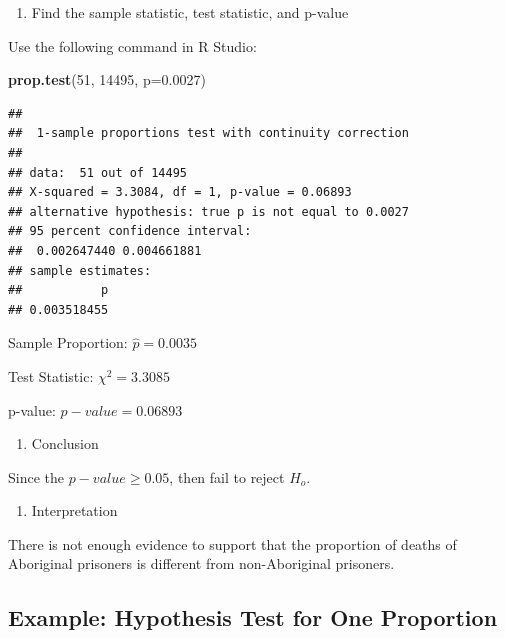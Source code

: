 \documentclass[
]{book}
\newenvironment{Shaded}{\begin{snugshade}}{\end{snugshade}}
\newcommand{\DataTypeTok}[1]{\textcolor[rgb]{0.13,0.29,0.53}{#1}}
\newcommand{\DecValTok}[1]{\textcolor[rgb]{0.00,0.00,0.81}{#1}}
\newcommand{\FloatTok}[1]{\textcolor[rgb]{0.00,0.00,0.81}{#1}}
\newcommand{\KeywordTok}[1]{\textcolor[rgb]{0.13,0.29,0.53}{\textbf{#1}}}
\newcommand{\NormalTok}[1]{#1}
\providecommand{\tightlist}{%
  \setlength{\itemsep}{0pt}\setlength{\parskip}{0pt}}
\begin{document}
\begin{enumerate}
\def\labelenumi{\arabic{enumi}.}
\setcounter{enumi}{3}
\tightlist
\item
  Find the sample statistic, test statistic, and p-value
\end{enumerate}

Use the following command in R Studio:

\begin{Shaded}
\begin{Highlighting}[]
\KeywordTok{prop.test}\NormalTok{(}\DecValTok{51}\NormalTok{, }\DecValTok{14495}\NormalTok{, }\DataTypeTok{p=}\FloatTok{0.0027}\NormalTok{)}
\end{Highlighting}
\end{Shaded}

\begin{verbatim}
## 
## 	1-sample proportions test with continuity correction
## 
## data:  51 out of 14495
## X-squared = 3.3084, df = 1, p-value = 0.06893
## alternative hypothesis: true p is not equal to 0.0027
## 95 percent confidence interval:
##  0.002647440 0.004661881
## sample estimates:
##           p 
## 0.003518455
\end{verbatim}

Sample Proportion: \(\hat{p}=0.0035\)

Test Statistic: \(\chi^2=3.3085\)

p-value: \(p-value=0.06893\)

\begin{enumerate}
\def\labelenumi{\arabic{enumi}.}
\setcounter{enumi}{4}
\tightlist
\item
  Conclusion
\end{enumerate}

Since the \(p-value\ge0.05\), then fail to reject \(H_o\).

\begin{enumerate}
\def\labelenumi{\arabic{enumi}.}
\setcounter{enumi}{5}
\tightlist
\item
  Interpretation
\end{enumerate}

There is not enough evidence to support that the proportion of deaths of Aboriginal prisoners is different from non-Aboriginal prisoners.

\hypertarget{example-hypothesis-test-for-one-proportion-1}{%
\subsection{Example: Hypothesis Test for One Proportion}\label{example-hypothesis-test-for-one-proportion-1}}
\end{document}
